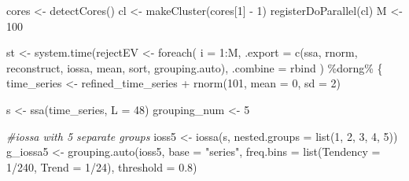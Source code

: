 \documentclass[specialist,
               substylefile = spbu_report.rtx,
               subf,href,colorlinks=true, 12pt]{disser}
\theoremstyle{definition}
\newenvironment{Shaded}{\begin{snugshade}}{\end{snugshade}}
\newcommand{\AttributeTok}[1]{\textcolor[rgb]{0.77,0.63,0.00}{#1}}
\newcommand{\CommentTok}[1]{\textcolor[rgb]{0.56,0.35,0.01}{\textit{#1}}}
\newcommand{\DecValTok}[1]{\textcolor[rgb]{0.00,0.00,0.81}{#1}}
\newcommand{\FloatTok}[1]{\textcolor[rgb]{0.00,0.00,0.81}{#1}}
\newcommand{\FunctionTok}[1]{\textcolor[rgb]{0.00,0.00,0.00}{#1}}
\newcommand{\NormalTok}[1]{#1}
\newcommand{\OtherTok}[1]{\textcolor[rgb]{0.56,0.35,0.01}{#1}}
\newcommand{\SpecialCharTok}[1]{\textcolor[rgb]{0.00,0.00,0.00}{#1}}
\newcommand{\StringTok}[1]{\textcolor[rgb]{0.31,0.60,0.02}{#1}}
\begin{document}
\begin{Shaded}
\begin{Highlighting}[]
\NormalTok{  cores }\OtherTok{\textless{}{-}} \FunctionTok{detectCores}\NormalTok{()}
\NormalTok{  cl }\OtherTok{\textless{}{-}} \FunctionTok{makeCluster}\NormalTok{(cores[}\DecValTok{1}\NormalTok{] }\SpecialCharTok{{-}} \DecValTok{1}\NormalTok{)}
  \FunctionTok{registerDoParallel}\NormalTok{(cl)}
\NormalTok{  M }\OtherTok{\textless{}{-}} \DecValTok{100}
  
\NormalTok{  st }\OtherTok{\textless{}{-}} \FunctionTok{system.time}\NormalTok{(rejectEV }\OtherTok{\textless{}{-}} \FunctionTok{foreach}\NormalTok{(}
    \AttributeTok{i =} \DecValTok{1}\SpecialCharTok{:}\NormalTok{M,}
    \AttributeTok{.export =} \FunctionTok{c}\NormalTok{(}\StringTok{\textquotesingle{}ssa\textquotesingle{}}\NormalTok{, }\StringTok{\textquotesingle{}rnorm\textquotesingle{}}\NormalTok{, }\StringTok{\textquotesingle{}reconstruct\textquotesingle{}}\NormalTok{, }\StringTok{\textquotesingle{}iossa\textquotesingle{}}\NormalTok{, }\StringTok{\textquotesingle{}mean\textquotesingle{}}\NormalTok{, }\StringTok{\textquotesingle{}sort\textquotesingle{}}\NormalTok{, }\StringTok{\textquotesingle{}grouping.auto\textquotesingle{}}\NormalTok{),}
    \AttributeTok{.combine =}\NormalTok{ rbind}
\NormalTok{  ) }\SpecialCharTok{\%dorng\%}\NormalTok{ \{}
\NormalTok{    time\_series }\OtherTok{\textless{}{-}}\NormalTok{ refined\_time\_series }\SpecialCharTok{+} \FunctionTok{rnorm}\NormalTok{(}\DecValTok{101}\NormalTok{, }\AttributeTok{mean =} \DecValTok{0}\NormalTok{, }\AttributeTok{sd =} \DecValTok{2}\NormalTok{)}
    
\NormalTok{    s }\OtherTok{\textless{}{-}} \FunctionTok{ssa}\NormalTok{(time\_series, }\AttributeTok{L =} \DecValTok{48}\NormalTok{)}
\NormalTok{    grouping\_num }\OtherTok{\textless{}{-}} \DecValTok{5}
    
    \CommentTok{\#iossa with 5 separate groups}
\NormalTok{    ioss5 }\OtherTok{\textless{}{-}} \FunctionTok{iossa}\NormalTok{(s, }\AttributeTok{nested.groups =} \FunctionTok{list}\NormalTok{(}\DecValTok{1}\NormalTok{, }\DecValTok{2}\NormalTok{, }\DecValTok{3}\NormalTok{, }\DecValTok{4}\NormalTok{, }\DecValTok{5}\NormalTok{))}
\NormalTok{    g\_iossa5 }\OtherTok{\textless{}{-}} \FunctionTok{grouping.auto}\NormalTok{(ioss5, }\AttributeTok{base =} \StringTok{"series"}\NormalTok{, }
                   \AttributeTok{freq.bins =} \FunctionTok{list}\NormalTok{(}\AttributeTok{Tendency =} \DecValTok{1}\SpecialCharTok{/}\DecValTok{240}\NormalTok{, }\AttributeTok{Trend =} \DecValTok{1}\SpecialCharTok{/}\DecValTok{24}\NormalTok{), }
                   \AttributeTok{threshold =} \FloatTok{0.8}\NormalTok{)}
                   

\end{Highlighting}
\end{Shaded}
\end{document}
